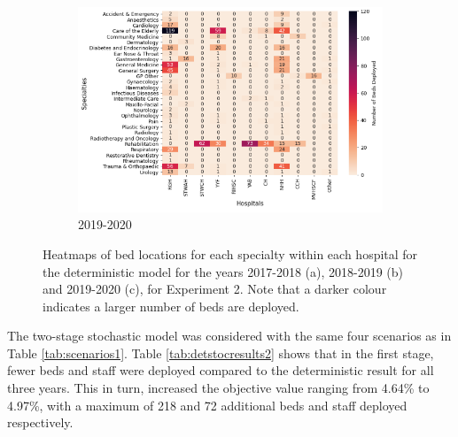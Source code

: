 \documentclass[../thesis.tex]{subfiles}
\begin{document}
\begin{figure}\ContinuedFloat
     \begin{subfigure}{0.8\textwidth}
         \centering
         \includegraphics[width=\textwidth]{Chapters/Chapter5/Figures/2019DET.png}
         \caption{2019-2020}
         \label{fig:detexp2c}
     \end{subfigure}
        \caption{Heatmaps of bed locations for each specialty within each hospital for the deterministic model for the years 2017-2018 (a), 2018-2019 (b) and 2019-2020 (c), for Experiment 2. Note that a darker colour indicates a larger number of beds are deployed.}
        \label{fig:detexp2}
\end{figure}
\FloatBarrier
    
The two-stage stochastic model was considered with the same four scenarios as in Table \ref{tab:scenarios1}. Table \ref{tab:detstocresults2} shows that in the first stage, fewer beds and staff were deployed compared to the deterministic result for all three years. This in turn, increased the objective value ranging from 4.64\% to 4.97\%, with a maximum of 218 and 72 additional beds and staff deployed respectively. 
\end{document}
